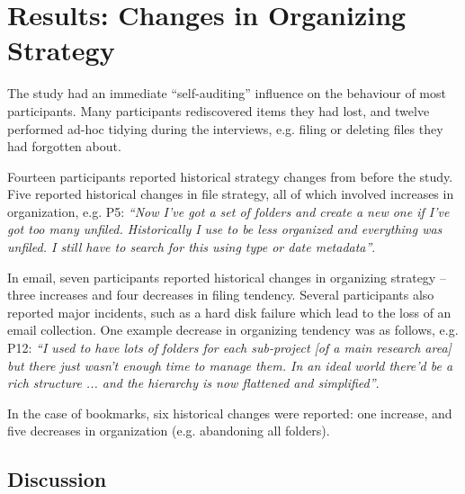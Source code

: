 \newpage
\section{Results: Changes in Organizing Strategy}
\label{exp-study:comparison-changes}


The study had an immediate ``self-auditing'' influence on the behaviour of most participants.
Many participants rediscovered items they had lost, and twelve performed ad-hoc tidying during the interviews, e.g. filing or deleting files they had forgotten about.


Fourteen participants reported historical strategy changes from before the study. Five reported historical changes in file strategy, all of which involved increases in organization, e.g. P5: \textit{``Now I've got a set of folders and create a new one if I've got too many unfiled.  Historically I use to be less organized and everything was unfiled.  I still have to search for this using type or date metadata''}.

In email, seven participants reported historical changes in organizing strategy  -- three increases and four decreases in filing tendency.  Several participants also reported major incidents, such as a hard disk failure which lead to the loss of an email collection.  One example decrease in organizing tendency was as follows, e.g. P12: \textit{``I used to have lots of folders for each sub-project [of a main research area] but there just wasn't enough time to manage them. In an ideal world there'd be a rich structure ... and the hierarchy is now flattened and simplified''}.

In the case of bookmarks, six historical changes were reported: one increase, and five decreases in organization (e.g. abandoning all folders).

\subsection{Discussion}

